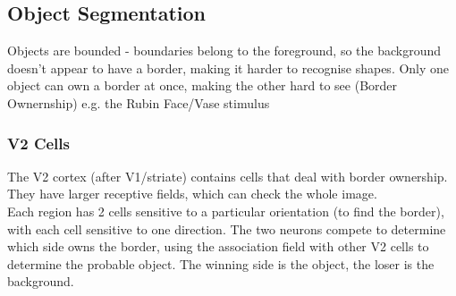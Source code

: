 \subsection{Object Segmentation}
Objects are bounded - boundaries belong to the foreground, so the background doesn't appear to have a border, making it harder to recognise shapes. Only one object can own a border at once, making the other hard to see (Border Ownernship) e.g. the Rubin Face/Vase stimulus

\subsubsection{V2 Cells}
The V2 cortex (after V1/striate) contains cells that deal with border ownership. They have larger receptive fields, which can check the whole image.\\

Each region has 2 cells sensitive to a particular orientation (to find the border), with each cell sensitive to one direction. The two neurons compete to determine which side owns the border, using the association field with other V2 cells to determine the probable object. The winning side is the object, the loser is the background.
